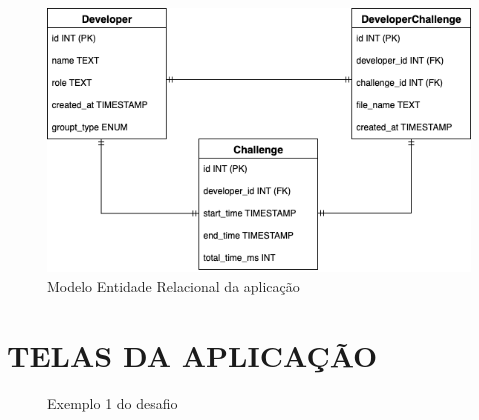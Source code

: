 \documentclass[english,brazilian]{UNISINOSartigo} %
\begin{document}
\begin{figure}[ht]
    \caption{Modelo Entidade Relacional da aplicação}
    \vspace{1em}
    \label{fig:diagrama_er_banco}
    \centering%
    \footnotesize
	\begin{minipage}{.9\textwidth}
		\includegraphics[width=\textwidth]{images/diagrama_er_banco.png}
	\end{minipage}
\end{figure}
\FloatBarrier

\section{TELAS DA APLICAÇÃO}

\renewcommand{\thefigure}{B.\arabic{figure}}
\setcounter{figure}{0}

\begin{figure}[ht]
    \caption{Exemplo 1 do desafio}
    \label{fig:exemplo1}
    \centering
    \footnotesize
    \begin{minipage}{.9\textwidth}
        \centering
    \end{minipage}
\end{figure}
\FloatBarrier
\end{document}
